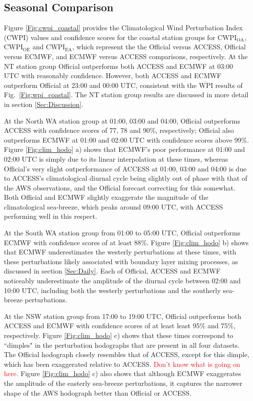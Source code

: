 \documentclass{ametsoc}
\begin{document}
\subsection{Seasonal Comparison}
\label{Sec:Seasonal}
Figure \ref{Fig:cwpi_coastal} provides the Climatological Wind Perturbation Index (CWPI) values and confidence scores for the coastal station groups for $\text{CWPI}_\text{OA}$, $\text{CWPI}_\text{OE}$ and $\text{CWPI}_\text{EA}$, which represent the the Official versus ACCESS, Official versus ECMWF, and ECMWF versus ACCESS comparisons, respectively. At the NT station group Official outperforms both ACCESS and ECMWF at 03:00 UTC with reasonably confidence. However, both ACCESS and ECMWF outperform Official at 23:00 and 00:00 UTC, consistent with the $\overline{\text{WPI}}$ results of Fig.~\ref{Fig:wpi_coastal}. The NT station group results are discussed in more detail in section \ref{Sec:Discussion}.

At the North WA station group at 01:00, 03:00 and 04:00, Official outperforms ACCESS with confidence scores of 77, 78 and 90\%, respectively; Official also outperforms ECMWF at 01:00 and 02:00 UTC with confidence scores above 99\%. Figure \ref{Fig:clim_hodo} a) shows that ECMWF's poor performance at 01:00 and 02:00 UTC is simply due to its linear interpolation at these times, whereas Official's very slight outperformance of ACCESS at 01:00, 03:00 and 04:00 is due to ACCESS's climatological diurnal cycle being slightly out of phase with that of the AWS observations, and the Official forecast correcting for this somewhat. Both Official and ECMWF slightly exaggerate the magnitude of the climatological sea-breeze, which peaks around 09:00 UTC, with ACCESS performing well in this respect.

At the South WA station group from 01:00 to 05:00 UTC, Official outperforms ECMWF with confidence scores of at least $88\%$. Figure \ref{Fig:clim_hodo} b) shows that ECMWF underestimates the westerly perturbations at these times, with these perturbations likely associated with boundary layer mixing processes, as discussed in section \ref{Sec:Daily}. Each of Official, ACCESS and ECMWF noticeably underestimate the amplitude of the diurnal cycle between 02:00 and 10:00 UTC, including both the westerly perturbations and the southerly sea-breeze perturbations. 

At the NSW station group from 17:00 to 19:00 UTC, Official outperforms both ACCESS and ECMWF with confidence scores of at least least 95\% and 75\%, respectively. Figure \ref{Fig:clim_hodo} c) shows that these times correspond to ``dimples" in the perturbation hodographs that are present in all four datasets. The Official hodograph closely resembles that of ACCESS, except for this dimple, which has been exaggerated relative to ACCESS. \textcolor{red}{Don't know what is going on here.} Figure \ref{Fig:clim_hodo} c) also shows that although ECMWF exaggerates the amplitude of the easterly sea-breeze perturbations, it captures the narrower shape of the AWS hodograph better than Official or ACCESS.
\end{document}
